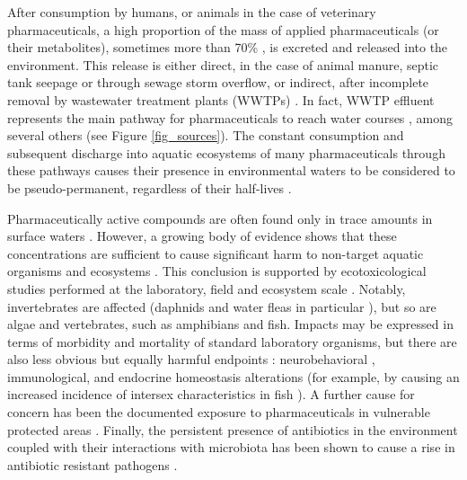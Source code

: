 \documentclass{article}
\begin{document}
After consumption by humans, or animals in the case of veterinary pharmaceuticals, a high proportion of the mass of applied pharmaceuticals (or their metabolites), sometimes more than 70\% \citep{Pal2010ImpactsEffects}, is excreted and released into the environment. This release is either direct, in the case of animal manure, septic tank seepage or through sewage storm overflow, or indirect, after incomplete removal by wastewater treatment plants (WWTPs) \citep{Yao2018OccurrenceStudy}. In fact, WWTP effluent represents the main pathway for pharmaceuticals to reach water courses \citep{Daughton2001PharmaceuticalsOverview}, among several others (see Figure \ref{fig_sources}). The constant consumption and subsequent discharge into aquatic ecosystems of many pharmaceuticals through these pathways causes their presence in environmental waters to be considered to be pseudo-permanent, regardless of their half-lives \citep{Feng2018Metal-mediatedAssessment}.

Pharmaceutically active compounds are often found only in trace amounts in surface waters \citep{Quesada2019SurfaceReview}. However, a growing body of evidence shows that these concentrations are sufficient to cause significant harm to non-target aquatic organisms and ecosystems \citep{Brodin2014EcologicalAlterations,Miller2018AFauna,Shaliutina-Kolesova2020TheReview}. This conclusion is supported by ecotoxicological studies performed at the laboratory, field and ecosystem scale \citep{ausderBeek2016PharmaceuticalsPerspectives}. Notably, invertebrates are affected (daphnids and water fleas in particular \citep{Pal2010ImpactsEffects}), but so are algae and vertebrates, such as amphibians and fish. Impacts may be expressed in terms of morbidity and mortality \citep{Kummerer2009TheChallenges} of standard laboratory organisms, but there are also less obvious but equally harmful endpoints \citep{Daughton2001PharmaceuticalsOverview}: neurobehavioral \citep{Brodin2014EcologicalAlterations,Shaliutina-Kolesova2020TheReview}, immunological, and endocrine homeostasis alterations (for example, by causing an increased incidence of intersex characteristics in fish \citep{Dong2015FateStream}). A further cause for concern has been the documented exposure to pharmaceuticals in vulnerable protected areas \citep{Bradley2020ExposureRegion}. Finally, the persistent presence of antibiotics in the environment coupled with their interactions with microbiota has been shown to cause a rise in antibiotic resistant pathogens \citep{Leonard2018ExposureSurvey,Segura2009ReviewWaters}.
\end{document}

